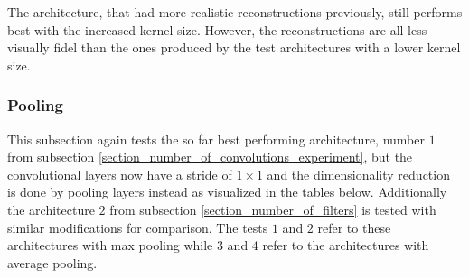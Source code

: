 The architecture, that had more realistic reconstructions previously, still performs best with the increased
kernel size. However, the reconstructions are all less visually fidel than the ones produced by the 
test architectures with a lower kernel size.

\subsubsection{Pooling}

This subsection again tests the so far best performing architecture, number $1$ from subsection 
\ref{section_number_of_convolutions_experiment}, but the convolutional layers now have a stride of $1\times1$
and the dimensionality reduction is done by pooling layers instead as visualized in the tables below. 
Additionally the architecture $2$ from subsection \ref{section_number_of_filters} is tested 
with similar modifications for comparison. The tests $1$ and $2$ refer to these architectures with max pooling
while $3$ and $4$ refer to the architectures with average pooling.

